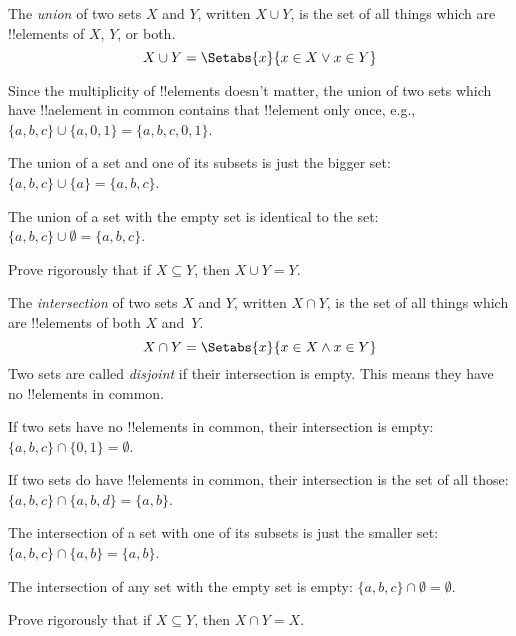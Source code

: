 \documentclass[../../../include/open-logic-section]{subfiles}
\begin{document}

\begin{defn}
The \emph{union} of two sets $X$ and $Y$, written $X \cup Y$, is the
set of all things which are !!{element}s of $X$, $Y$, or both.
\[
X \cup Y = \Setabs{x}{x \in X \lor x\in Y}
\]
\end{defn}

\begin{ex}
Since the multiplicity of !!{element}s doesn't matter, the union of two
sets which have !!a{element} in common contains that !!{element} only once,
e.g., $\{ a, b, c\} \cup \{ a, 0, 1\} = \{a, b, c, 0, 1\}$.

The union of a set and one of its subsets is just the bigger set: $\{a,
b, c \} \cup \{a \} = \{a, b, c\}$.

The union of a set with the empty set is identical to the set: $\{a,
b, c \} \cup \emptyset = \{a, b, c \}$.
\end{ex}

\begin{prob}
Prove rigorously that if $X \subseteq Y$, then $X \cup Y = Y$.
\end{prob}

\begin{defn}
The \emph{intersection} of two sets $X$ and $Y$, written $X \cap Y$, is
the set of all things which are !!{element}s of both $X$ and~$Y$.
\[
X \cap Y = \Setabs{x}{x \in X \land x\in Y}
\]
Two sets are called \emph{disjoint} if their intersection is
empty. This means they have no !!{element}s in common.
\end{defn}

\begin{ex}
If two sets have no !!{element}s in common, their intersection is empty:
$\{ a, b, c\} \cap \{ 0, 1\} = \emptyset$.

If two sets do have !!{element}s in common, their intersection is the set of
all those: $\{a, b, c \} \cap \{a, b, d \} = \{a, b\}$.

The intersection of a set with one of its subsets is just the smaller
set: $\{a, b, c\} \cap \{a, b\} = \{a, b\}$.

The intersection of any set with the empty set is empty: $\{a, b, c \}
\cap \emptyset = \emptyset$.
\end{ex}

\begin{prob}
Prove rigorously that if $X \subseteq Y$, then $X \cap Y = X$.
\end{prob}
\end{document}
